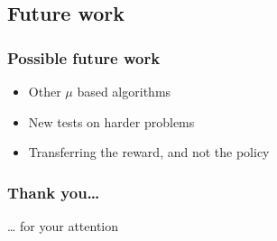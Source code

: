 \documentclass{beamer}
\begin{document}
\subsection{Future work}
\label{sec-5_1}
\begin{frame}
\frametitle{Possible future work}
\label{sec-5_1_1}
\begin{itemize}

\item Other $\mu$ based algorithms\\
\label{sec-5_1_1_1}%
\item New tests on harder problems\\
\label{sec-5_1_1_2}%
\item Transferring the reward, and not the policy\\
\label{sec-5_1_1_3}%
\end{itemize} %
\end{frame}
\begin{frame}
\frametitle{Thank you\ldots{}}
\label{sec-5_1_2}

    \ldots{} for your attention
\end{frame}
\end{document}
